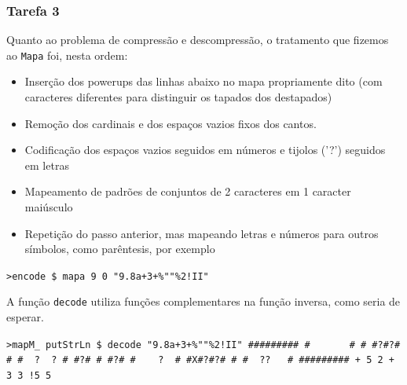 \documentclass[a4paper]{article}
\begin{document}
\subsubsection{Tarefa 3}
    \hspace{0.54cm}Quanto ao problema de compressão e descompressão, o tratamento que fizemos ao \texttt{Mapa} foi,
    nesta ordem:
    \begin{itemize}
    \item Inserção dos powerups das linhas abaixo no mapa propriamente dito (com caracteres diferentes
          para distinguir os tapados dos destapados)
    \item Remoção dos cardinais e dos espaços vazios fixos dos cantos.
    \item Codificação dos espaços vazios seguidos em números e tijolos ('?') seguidos em letras
    \item Mapeamento de padrões de conjuntos de 2 caracteres em 1 caracter maiúsculo
    \item Repetição do passo anterior, mas mapeando letras e números para outros símbolos, como parêntesis,
          por exemplo 
    \end{itemize}
    
    \texttt{>encode \$ mapa 9 0 \linebreak
               \hspace{3cm}"9.8a+3+\%""\%2!II"} \linebreak

    A função \texttt{decode} utiliza funções complementares na função inversa, como seria de esperar.\linebreak

    \texttt{>mapM\_ putStrLn \$ decode "9.8a+3+\%""\%2!II"
        \linebreak \#\#\#\#\#\#\#\#\#
        \linebreak \# \ \  \ \ \ \ \#
        \linebreak \# \#?\#?\# \#
        \linebreak \#\ \ ?\ \ ?\ \#
        \linebreak \#?\# \# \#?\#
        \linebreak \#\ \ \ \ ?\ \ \#
        \linebreak \#X\#?\#?\# \#
        \linebreak \# \ ??\ \ \ \#
        \linebreak \#\#\#\#\#\#\#\#\#
        \linebreak + 5 2
        \linebreak + 3 3
        \linebreak !\hspace{0.20cm}5 5}
    
\end{document}
